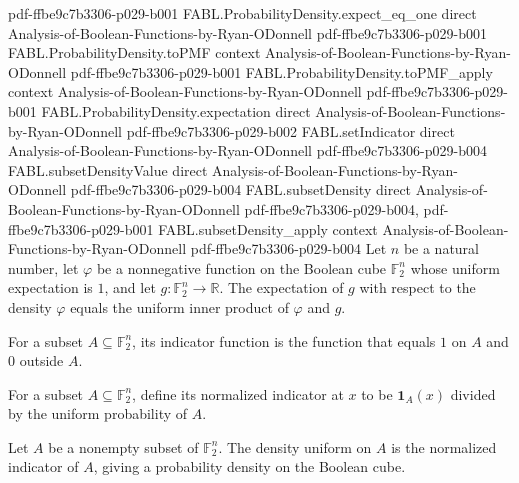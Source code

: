 \begin{theorem}
  {pdf-ffbe9c7b3306-p029-b001}
\proofstep
  {FABL.ProbabilityDensity.expect_eq_one}
  {direct}
  {Analysis-of-Boolean-Functions-by-Ryan-ODonnell}
  {pdf-ffbe9c7b3306-p029-b001}
\proofstep
  {FABL.ProbabilityDensity.toPMF}
  {context}
  {Analysis-of-Boolean-Functions-by-Ryan-ODonnell}
  {pdf-ffbe9c7b3306-p029-b001}
\proofstep
  {FABL.ProbabilityDensity.toPMF_apply}
  {context}
  {Analysis-of-Boolean-Functions-by-Ryan-ODonnell}
  {pdf-ffbe9c7b3306-p029-b001}
\proofstep
  {FABL.ProbabilityDensity.expectation}
  {direct}
  {Analysis-of-Boolean-Functions-by-Ryan-ODonnell}
  {pdf-ffbe9c7b3306-p029-b002}
\proofstep
  {FABL.setIndicator}
  {direct}
  {Analysis-of-Boolean-Functions-by-Ryan-ODonnell}
  {pdf-ffbe9c7b3306-p029-b004}
\proofstep
  {FABL.subsetDensityValue}
  {direct}
  {Analysis-of-Boolean-Functions-by-Ryan-ODonnell}
  {pdf-ffbe9c7b3306-p029-b004}
\proofstep
  {FABL.subsetDensity}
  {direct}
  {Analysis-of-Boolean-Functions-by-Ryan-ODonnell}
  {pdf-ffbe9c7b3306-p029-b004,
    pdf-ffbe9c7b3306-p029-b001}
\proofstep
  {FABL.subsetDensity_apply}
  {context}
  {Analysis-of-Boolean-Functions-by-Ryan-ODonnell}
  {pdf-ffbe9c7b3306-p029-b004}
Let $n$ be a natural number, let $\varphi$ be a nonnegative function on the Boolean cube
$\mathbb{F}_2^n$ whose uniform expectation is $1$, and let
$g:\mathbb{F}_2^n\to\mathbb{R}$. The expectation of $g$ with respect to the density
$\varphi$ equals the uniform inner product of $\varphi$ and $g$.
\end{theorem}

\begin{definition}
\label{FABL.setIndicator}
\leanok
For a subset $A\subseteq\mathbb{F}_2^n$, its indicator function is the function that
equals $1$ on $A$ and $0$ outside $A$.
\end{definition}

\begin{definition}
\label{FABL.subsetDensityValue}
\leanok
{}
For a subset $A\subseteq\mathbb{F}_2^n$, define its normalized indicator at $x$ to be
$\mathbf{1}_A(x)$ divided by the uniform probability of $A$.
\end{definition}

\begin{definition}
\label{FABL.subsetDensity}
\leanok
{}
Let $A$ be a nonempty subset of $\mathbb{F}_2^n$. The density uniform on $A$ is the
normalized indicator of $A$, giving a probability density on the Boolean cube.
\end{definition}

